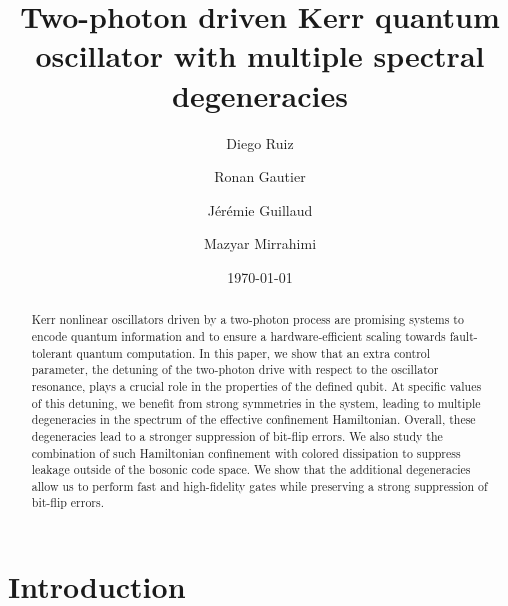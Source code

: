 \documentclass[%
 reprint,
 superscriptaddress,
 amsmath,
 amssymb,
 aps,
 pra,
 10pt
]{revtex4-2}
\begin{document}
\title{Two-photon driven Kerr quantum oscillator with multiple spectral degeneracies}
\author{Diego Ruiz}
%
\author{Ronan Gautier}%
\author{Jérémie Guillaud}%
\author{Mazyar Mirrahimi}%


\date{\today}

\begin{abstract}
Kerr nonlinear oscillators driven by a two-photon process are promising systems to encode quantum information and to ensure a hardware-efficient scaling towards fault-tolerant quantum computation. In this paper, we show that an extra control parameter, the detuning of the two-photon drive with respect to the oscillator resonance, plays a crucial role in the properties of the defined qubit. At specific values of this detuning, we benefit from strong symmetries in the system, leading to multiple degeneracies in the spectrum of the effective confinement Hamiltonian. Overall, these degeneracies lead to a stronger suppression of bit-flip errors. We also study the combination of such Hamiltonian confinement with colored dissipation to suppress leakage outside of the bosonic code space. We show that the additional degeneracies allow us to perform fast and high-fidelity gates while preserving a strong suppression of bit-flip errors.
\end{abstract}


\maketitle


\section{\label{sec:level1}Introduction}
\end{document}
